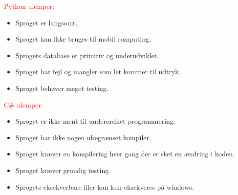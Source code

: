 \documentclass[class=report, crop=false]{standalone}
\begin{document}
        \begin{multicols}{2}
        \raggedcolumns
        \begin{tcolorbox}
        \noindent\textcolor{red}{Python ulemper:}
        \begin{itemize}
            \setlength{\itemsep}{0pt}
            \setlength{\parskip}{0pt}
            \item Sproget er langsomt.
            \item Sproget kan ikke bruges til mobil computing.
            \item Sprogets database er primitiv og underudviklet.
            \item Sproget har fejl og mangler som let kommer til udtryk.
            \item Sproget behøver meget testing.
        \end{itemize}
        \vspace*{4pt}
        \end{tcolorbox}
        \columnbreak

        \begin{tcolorbox}
        \noindent\textcolor{red}{C\# ulemper:}
        \begin{itemize}
            \setlength{\itemsep}{0pt}
            \setlength{\parskip}{0pt}
            \item Sproget er ikke ment til underordnet programmering.
            \item Sproget har ikke nogen ubegrænset kompiler.
            \item Sproget kræver en kompilering hver gang der er sket en ændring i koden.
            \item Sproget kræver grundig testing.
            \item Sprogets eksekverbare filer kan kun eksekveres på windows.
        \end{itemize}
        \end{tcolorbox}
        \end{multicols}
    
\end{document}
